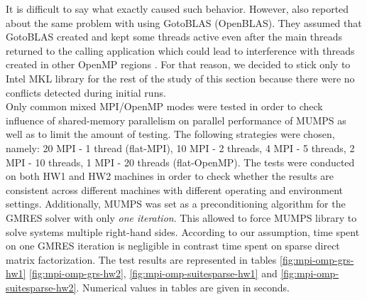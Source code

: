 It is difficult to say what exactly caused such behavior. However, \citeauthor{chowdhury2010some} also reported about the same problem with using GotoBLAS (OpenBLAS). They assumed that GotoBLAS created and kept some threads active even after the main threads returned to the calling application which could lead to interference with threads created in other OpenMP regions \cite{chowdhury2010some}. For that reason, we decided to stick only to Intel MKL library for the rest of the study of this section because there were no conflicts detected during initial runs.\\


Only common mixed MPI/OpenMP modes were tested in order to check influence of shared-memory parallelism on parallel performance of MUMPS as well as to limit the amount of testing. The following strategies were chosen, namely: 20 MPI - 1 thread (flat-MPI), 10 MPI - 2 threads, 4 MPI - 5 threads, 2 MPI - 10 threads, 1 MPI - 20 threads (flat-OpenMP). The tests were conducted on both HW1 and HW2 machines in order to check whether the results are consistent across different machines with different operating and environment settings. Additionally, MUMPS was set as a preconditioning algorithm for the GMRES solver with only \textit{one iteration}. This allowed to force MUMPS library to solve systems multiple right-hand sides. According to our assumption, time spent on one GMRES iteration is negligible in contrast time spent on sparse direct matrix factorization. The test results are represented in tables \ref{fig:mpi-omp-grs-hw1} \ref{fig:mpi-omp-grs-hw2}, \ref{fig:mpi-omp-suitesparse-hw1} and \ref{fig:mpi-omp-suitesparse-hw2}. Numerical values in tables are given in seconds.\\


